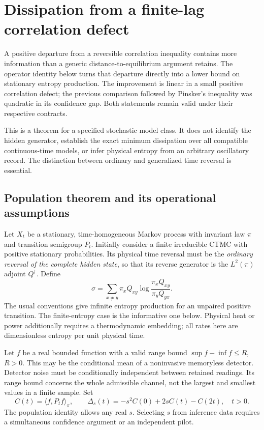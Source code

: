 \chapter{Dissipation from a finite-lag correlation defect}
\label{ch:pa-spectral-dynamics}

A positive departure from a reversible correlation inequality contains more
information than a generic distance-to-equilibrium argument retains. The
operator identity below turns that departure directly into a lower bound on
stationary entropy production. The improvement is linear in a small positive
correlation defect; the previous comparison followed by Pinsker's inequality
was quadratic in its confidence gap. Both statements remain valid under their
respective contracts.

This is a theorem for a specified stochastic model class. It does not identify
the hidden generator, establish the exact minimum dissipation over all
compatible continuous-time models, or infer physical entropy from an arbitrary
oscillatory record. The distinction between ordinary and generalized time
reversal is essential.

\section{Population theorem and its operational assumptions}

Let $X_t$ be a stationary, time-homogeneous Markov process with invariant law
$\pi$ and transition semigroup $P_t$. Initially consider a finite irreducible
CTMC with positive stationary probabilities. Its physical time reversal must
be the \emph{ordinary reversal of the complete hidden state}, so that its
reverse generator is the $L^2(\pi)$ adjoint $Q^\dagger$. Define
\[
 \sigma=\sum_{x\ne y}\pi_x Q_{xy}
       \log\frac{\pi_xQ_{xy}}{\pi_yQ_{yx}}.
\]
The usual conventions give infinite entropy production for an unpaired
positive transition. The finite-entropy case is the informative one below.
Physical heat or power additionally requires a thermodynamic embedding; all
rates here are dimensionless entropy per unit physical time.

Let $f$ be a real bounded function with a valid range bound
$\sup f-\inf f\leq R$, $R>0$. This may be the conditional mean of a
noninvasive memoryless detector. Detector noise must be conditionally
independent between retained readings. Its range bound concerns the whole
admissible channel, not the largest and smallest values in a finite sample.
Set
\[
 C(t)=\langle f,P_t f\rangle_\pi,
 \qquad
 \Delta_s(t)=-s^2 C(0)+2sC(t)-C(2t),\quad t>0.
\]
The population identity allows any real $s$. Selecting $s$ from inference
data requires a simultaneous confidence argument or an independent pilot.

